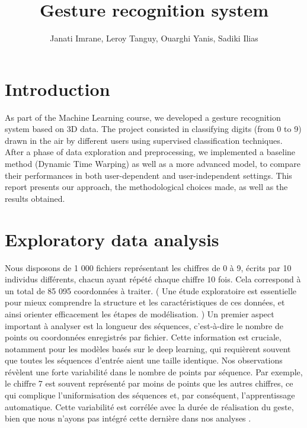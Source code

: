 \documentclass{article}
\author{Janati Imrane, Leroy Tanguy, Ouarghi Yanis, Sadiki Ilias}
\date{}
\begin{document}
\title{Gesture recognition system}
\maketitle

\section{Introduction}
As part of the Machine Learning course, 
we developed a gesture recognition system based on 3D data. 
The project consisted in classifying digits (from 0 to 9) 
drawn in the air by different users using supervised classification techniques. 
After a phase of data exploration and preprocessing, 
we implemented a baseline method (Dynamic Time Warping) 
as well as a more advanced model, to compare their performances 
in both user-dependent and user-independent settings. 
This report presents our approach, the methodological choices made, 
as well as the results obtained.

\section{Exploratory data analysis}
Nous disposons de 1 000 fichiers représentant les chiffres de 0 à 9, écrits par 10 individus différents, chacun ayant répété chaque chiffre 10 fois. Cela correspond à un total de 85 095 coordonnées à traiter.
( Une étude exploratoire est essentielle pour mieux comprendre la structure et les caractéristiques de ces données, et ainsi orienter efficacement les étapes de modélisation. )
Un premier aspect important à analyser est la longueur des séquences, c’est-à-dire le nombre de points ou coordonnées enregistrés par fichier. Cette information est cruciale, notamment pour les modèles basés sur le deep learning, qui requièrent souvent que toutes les séquences d’entrée aient une taille identique.
Nos observations révèlent une forte variabilité dans le nombre de points par séquence. Par exemple, le chiffre 7 est souvent représenté par moins de points que les autres chiffres, ce qui complique l’uniformisation des séquences et, par conséquent, l’apprentissage automatique. Cette variabilité est corrélée avec la durée de réalisation du geste, bien que nous n’ayons pas intégré cette dernière dans nos analyses .
\end{document}
